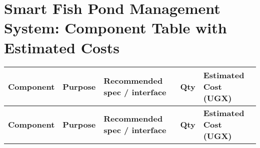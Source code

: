 \documentclass[12pt,a4paper]{article}
\begin{document}
\section*{Smart Fish Pond Management System: Component Table with Estimated Costs}

\begin{longtable}{|>{\raggedright\arraybackslash}p{3.2cm}|
                    >{\raggedright\arraybackslash}p{5.0cm}|
                    >{\raggedright\arraybackslash}p{5.5cm}|
                    >{\centering\arraybackslash}p{1.2cm}|
                    >{\centering\arraybackslash}p{2.5cm}|}
\hline
\textbf{Component} & \textbf{Purpose} & \textbf{Recommended spec / interface} & \textbf{Qty} & \textbf{Estimated Cost (UGX)} \\
\hline
\endfirsthead

\hline
\textbf{Component} & \textbf{Purpose} & \textbf{Recommended spec / interface} & \textbf{Qty} & \textbf{Estimated Cost (UGX)} \\
\hline
\endhead


\end{longtable}
\end{document}
